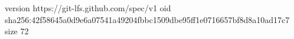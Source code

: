 version https://git-lfs.github.com/spec/v1
oid sha256:42f58645a0d9e6a07541a49204fbbc1509dbe95ff1e0716657bf8d8a10ad17c7
size 72
